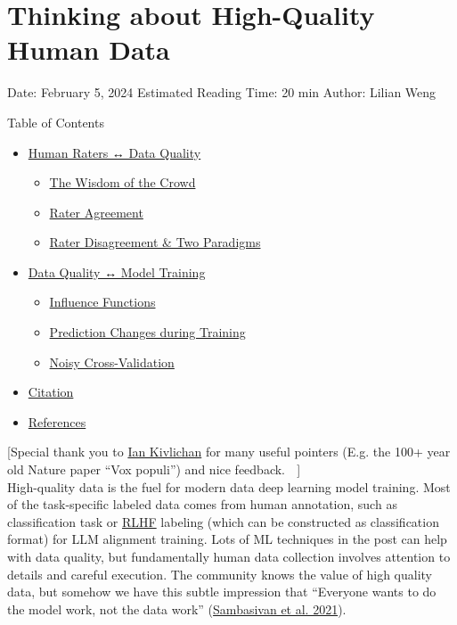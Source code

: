 \section{Thinking about High-Quality Human Data}\label{thinking-about-high-quality-human-data}

Date: February 5, 2024 \textbar{} Estimated Reading Time: 20 min \textbar{} Author: Lilian Weng

{Table of Contents}

\begin{itemize}
\tightlist
\item
  \hyperref[human-raters--data-quality]{Human Raters ↔ Data Quality}

  \begin{itemize}
  \tightlist
  \item
    \hyperref[the-wisdom-of-the-crowd]{The Wisdom of the Crowd}
  \item
    \hyperref[rater-agreement]{Rater Agreement}
  \item
    \hyperref[rater-disagreement--two-paradigms]{Rater Disagreement \& Two Paradigms}
  \end{itemize}
\item
  \hyperref[data-quality--model-training]{Data Quality ↔ Model Training}

  \begin{itemize}
  \tightlist
  \item
    \hyperref[influence-functions]{Influence Functions}
  \item
    \hyperref[prediction-changes-during-training]{Prediction Changes during Training}
  \item
    \hyperref[noisy-cross-validation]{Noisy Cross-Validation}
  \end{itemize}
\item
  \hyperref[citation]{Citation}
\item
  \hyperref[references]{References}
\end{itemize}

{{[}Special thank you to \href{https://scholar.google.com/citations?user=FRBObOwAAAAJ&hl=en}{Ian Kivlichan} for many useful pointers (E.g. the 100+ year old Nature paper ``Vox populi'') and nice feedback. 🙏 {]}}\\

High-quality data is the fuel for modern data deep learning model training. Most of the task-specific labeled data comes from human annotation, such as classification task or \href{https://lilianweng.github.io/posts/2021-01-02-controllable-text-generation/\#rl-fine-tuning-with-human-preferences}{RLHF} labeling (which can be constructed as classification format) for LLM alignment training. Lots of ML techniques in the post can help with data quality, but fundamentally human data collection involves attention to details and careful execution. The community knows the value of high quality data, but somehow we have this subtle impression that ``Everyone wants to do the model work, not the data work'' (\href{https://dl.acm.org/doi/abs/10.1145/3411764.3445518}{Sambasivan et al. 2021}).


